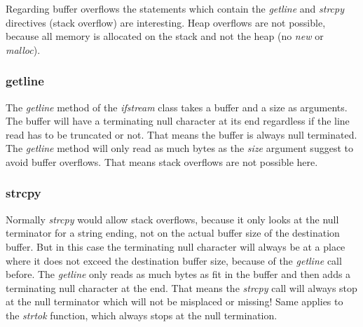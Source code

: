 Regarding buffer overflows the statements which contain the \textit{getline} and \textit{strcpy} directives (stack overflow)  are interesting. Heap overflows are not possible, because all memory is allocated on the stack and not the heap (no \textit{new} or \textit{malloc}).

\subsubsection{getline}

The \textit{getline} method of the \textit{ifstream} class takes a buffer and a size as arguments. The buffer will have a terminating null character at its end regardless if the line read has to be truncated or not. That means the buffer is always null terminated. The \textit{getline} method will only read as much bytes as the \textit{size} argument suggest to avoid buffer overflows. That means stack overflows are not possible here.

\subsubsection{strcpy}

Normally \textit{strcpy} would allow stack overflows, because it only looks at the null terminator for a string ending, not on the actual buffer size of the destination buffer. But in this case the terminating null character will always be at a place where it does not exceed the destination buffer size, because of the \textit{getline} call before. The \textit{getline} only reads as much bytes as fit in the buffer and then adds a terminating null character at the end. That means the \textit{strcpy} call will always stop at the null terminator which will not be misplaced or missing! Same applies to the \textit{strtok} function, which always stops at the null termination.